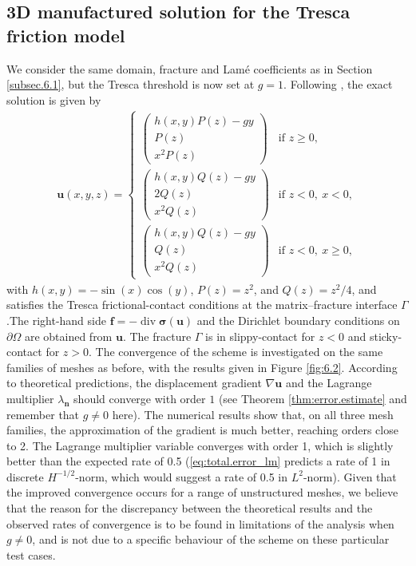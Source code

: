 \documentclass[a4paper,11pt]{article}
\theoremstyle{definition}
\theoremstyle{remark}
\newcommand{\bo}[1]{\mathbf{#1}}
\def\[{\partial}
\begin{document}
\subsection{3D manufactured solution for the Tresca friction model}\label{subsec.6.2}

We consider the same domain, fracture and Lamé coefficients as in Section \ref{subsec.6.1}, but the Tresca threshold is now set at $g=1$. Following \cite{jhr}, the exact solution is given by
\begin{align*}%
\bo{u}(x,y,z) =
\begin{cases}
\begin{pmatrix}
h(x,y)P(z) - g y \\
P(z) \\
x^2 P(z)
\end{pmatrix} & \text{if } z \ge 0, \\[1.2em]
\begin{pmatrix}
h(x,y)Q(z) - g y \\
2Q(z) \\
x^2 Q(z)
\end{pmatrix} & \text{if } z < 0,~ x < 0, \\[1.2em]
\begin{pmatrix}
h(x,y)Q(z) - g y \\
Q(z) \\
x^2 Q(z)
\end{pmatrix} & \text{if } z < 0,~ x \ge 0,
\end{cases}
\end{align*}
with $h(x,y) = -\sin(x)\cos(y)$, $P(z) = z^2$, and $Q(z) = z^2/4$, 
and satisfies the Tresca frictional-contact conditions at the matrix–fracture interface $\Gamma$.The right-hand side $\mathbf{f} = -\operatorname{div}\boldsymbol{\sigma}(\mathbf{u})$ and the Dirichlet boundary conditions on $\partial\Omega$ are obtained from $\bo{u}$. The fracture $\Gamma$ is in slippy-contact for $z<0$ and sticky-contact for $z>0$. The convergence of the scheme is investigated on the same families of meshes as before, with the results given in Figure \ref{fig:6.2}. According to theoretical predictions, the displacement gradient $\nabla\bo{u}$ and the Lagrange multiplier $\lambda_{\bo{n}}$ should converge with order $1$ (see Theorem \ref{thm:error.estimate} and remember that $g\not= 0$ here). The numerical results show that, on all three mesh families, the approximation of the gradient is much better, reaching orders close to 2. 
The Lagrange multiplier variable converges with order 1, which is slightly better than the expected rate of 0.5 (\eqref{eq:total.error_lm} predicts a rate of 1 in discrete $H^{-1/2}$-norm, which would suggest a rate of 0.5 in $L^2$-norm). Given that the improved convergence occurs for a range of unstructured meshes, we believe that the reason for the discrepancy between the theoretical results and the observed rates of convergence is to be found in limitations of the analysis when $g\not=0$, and is not due to a specific behaviour of the scheme on these particular test cases.
\end{document}
